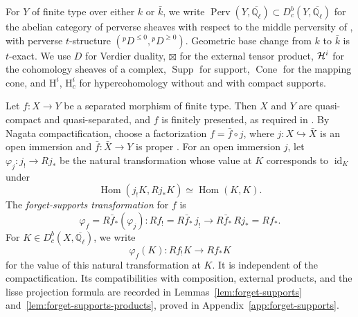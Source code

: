 \documentclass[12pt,reqno]{amsart}
\theoremstyle{definition}
\theoremstyle{plain}
\theoremstyle{definition}
\theoremstyle{remark}
\newcommand{\bbQ}{\mathbb{Q}}  \newcommand{\bbR}{\mathbb{R}}
\newcommand{\HH}{\mathrm{H}}  \newcommand{\JJ}{\mathrm{J}}
\newcommand{\ol}[1]{\overline{#1}}
\newcommand{\Ql}{\bbQ_{\ell}}
\newcommand{\Db}{D^b_c}
\newcommand{\Perv}{\operatorname{Perv}}
\newcommand{\Supp}{\operatorname{Supp}}
\newcommand{\Cone}{\operatorname{Cone}}
\begin{document}
For \(Y\) of finite type over either \(k\) or \(\bar k\), we write
\(\Perv(Y,\ol\Ql)\subset\Db(Y,\ol\Ql)\) for the abelian category of perverse sheaves with respect to the
middle perversity of \cite{BBDG18}, with perverse \(t\)-structure
\(({}^pD^{\le0},{}^pD^{\ge0})\).  Geometric base change from \(k\) to \(\bar k\) is \(t\)-exact.  We use
\(D\) for Verdier duality, \(\boxtimes\) for the external tensor product, \(\mathcal{H}^i\) for the cohomology
sheaves of a complex, \(\Supp\) for support, \(\Cone\) for the mapping cone, and \(\HH^i\), \(\HH^i_c\)
for hypercohomology without and with compact supports.

Let \(f\colon X\to Y\) be a separated morphism of finite type.  Then \(X\) and \(Y\) are quasi-compact
and quasi-separated, and \(f\) is finitely presented, as required in
\cite[Def.~6.7.6]{BhattScholze2015}.  By Nagata compactification, choose a factorization
\(f=\bar f\circ j\), where
\(j\colon X\hookrightarrow\bar X\) is an open immersion and \(\bar f\colon\bar X\to Y\) is proper
\cite[Tag~0F41]{stacks-project}.  For an open immersion \(j\), let \(\varphi_j\colon j_!\to Rj_*\) be the
natural transformation whose value at \(K\) corresponds to \(\operatorname{id}_K\) under
\[
        \operatorname{Hom}(j_!K,Rj_*K)\simeq\operatorname{Hom}(K,K).
\]
The \emph{forget-supports transformation} for \(f\) is
\begin{equation}
\label{eq:forget-supports}
        \varphi_f=R\bar f_*(\varphi_j)\colon
        Rf_!=R\bar f_*\,j_!\longrightarrow R\bar f_*\,Rj_*=Rf_*.
\end{equation}
For \(K\in\Db(X,\ol\Ql)\), we write
\[
        \varphi_f(K)\colon Rf_!K\longrightarrow Rf_*K
\]
for the value of this natural transformation at \(K\).
It is independent of the compactification.  Its compatibilities with composition, external products, and
the lisse projection formula are recorded in Lemmas~\ref{lem:forget-supports}
and~\ref{lem:forget-supports-products}, proved in Appendix~\ref{app:forget-supports}.
\end{document}
